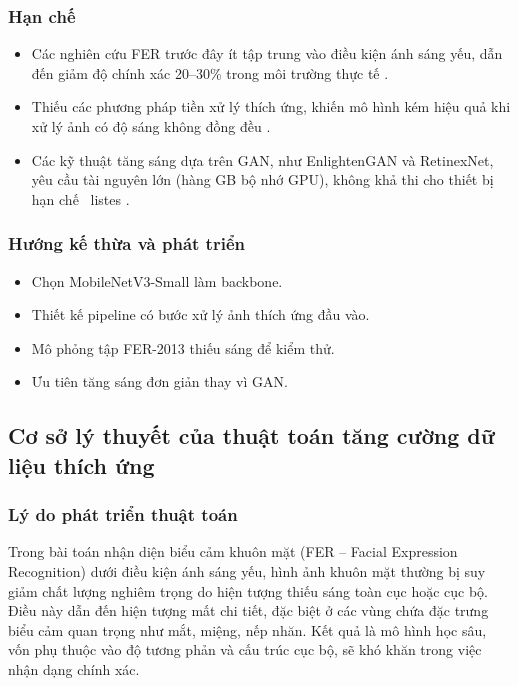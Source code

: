 \subsubsection{Hạn chế}
\begin{itemize}
    \item Các nghiên cứu FER trước đây ít tập trung vào điều kiện ánh sáng yếu, dẫn đến giảm độ chính xác 20--30\% trong môi trường thực tế \cite{mollahosseini2016}.
    \item Thiếu các phương pháp tiền xử lý thích ứng, khiến mô hình kém hiệu quả khi xử lý ảnh có độ sáng không đồng đều \cite{zhang2019, wang2020}.
    \item Các kỹ thuật tăng sáng dựa trên GAN, như EnlightenGAN và RetinexNet, yêu cầu tài nguyên lớn (hàng GB bộ nhớ GPU), không khả thi cho thiết bị hạn chế \ listes \cite{zhang2019}.
\end{itemize}

\subsubsection{Hướng kế thừa và phát triển}
\begin{itemize}
    \item Chọn MobileNetV3-Small làm backbone.
    \item Thiết kế pipeline có bước xử lý ảnh thích ứng đầu vào.
    \item Mô phỏng tập FER-2013 thiếu sáng để kiểm thử.
    \item Ưu tiên tăng sáng đơn giản thay vì GAN.
\end{itemize}

\subsection{Cơ sở lý thuyết của thuật toán tăng cường dữ liệu thích ứng} %

\subsubsection{Lý do phát triển thuật toán} %
Trong bài toán nhận diện biểu cảm khuôn mặt (FER -- Facial Expression Recognition) dưới điều kiện ánh sáng yếu, hình ảnh khuôn mặt thường bị suy giảm chất lượng nghiêm trọng do hiện tượng thiếu sáng toàn cục hoặc cục bộ. Điều này dẫn đến hiện tượng mất chi tiết, đặc biệt ở các vùng chứa đặc trưng biểu cảm quan trọng như mắt, miệng, nếp nhăn. Kết quả là mô hình học sâu, vốn phụ thuộc vào độ tương phản và cấu trúc cục bộ, sẽ khó khăn trong việc nhận dạng chính xác. 

